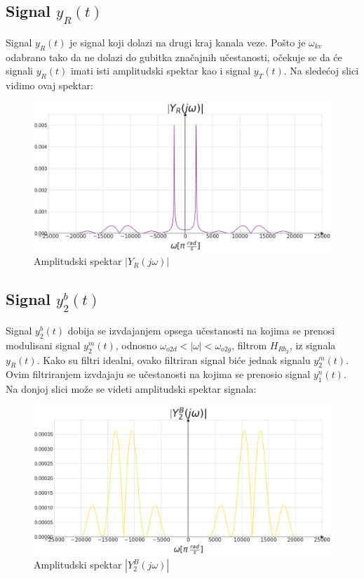 \documentclass[titlepage,a4paper,12pt]{article}
\begin{document}
	\subsection{Signal $y_R(t)$}
	Signal $y_R(t)$ je signal koji dolazi na drugi kraj kanala veze. Pošto je $\omega_{kv}$ odabrano tako da ne dolazi do gubitka značajnih učestanosti, očekuje se da će signali $y_R(t)$ imati isti amplitudski spektar kao i signal $y_T(t)$. Na sledećoj slici vidimo ovaj spektar:
	\begin{figure}[ht]
		\centering
		\includegraphics[width=\textwidth]{Images/AmpYR.png}
		\caption{Amplitudski spektar $|Y_R(j\omega)|$}\label{fig:AmpYR}
	\end{figure}
	\FloatBarrier
	\clearpage
	
	\subsection{Signal $y_2^b(t)$}
	Signal $y_2^b(t)$ dobija se izvdajanjem opsega učestanosti na kojima se prenosi modulisani signal $y_2^m(t)$, odnosno $\omega_{o2d}<|\omega|<\omega_{o2g}$, filtrom $H_{Rb_2}$, iz signala $y_R(t)$. Kako su filtri idealni, ovako filtriran signal biće jednak signalu $y_2^m(t)$. Ovim filtriranjem izvdajaju se učestanosti na kojima se prenosio signal $y_1^n(t)$. Na donjoj slici može se videti amplitudski spektar signala:
	\begin{figure}[ht]
		\centering
		\includegraphics[width=\textwidth]{Images/AmpY2B.png}
		\caption{Amplitudski spektar $|Y_2^B(j\omega)|$}\label{fig:AmpY2B}
	\end{figure}
	\FloatBarrier
	\clearpage
\end{document}
